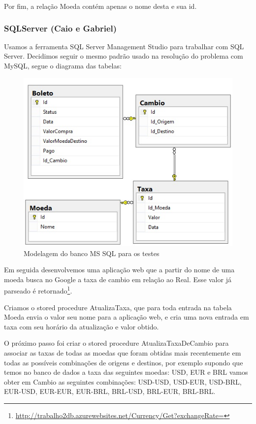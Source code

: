 \documentclass[conference]{IEEEtran}
\begin{document}
    Por fim, a relação Moeda contém apenas o nome desta e sua id.

    \subsubsection{SQLServer (Caio e Gabriel)}
  	Usamos a ferramenta SQL Server Management Studio para trabalhar com SQL Server.			
  	Decidimos seguir o mesmo padrão usado na resolução do problema com MySQL, segue o diagrama das tabelas:
   
    \begin{figure}[!t]
      \centering
  	  \includegraphics[scale=0.65]{img/tabela.jpg}
      \caption{Modelagem do banco MS SQL para os testes}
    \end{figure}

  	Em seguida desenvolvemos uma aplicação web que a partir do nome de uma moeda busca no Google a taxa de cambio em relação ao Real. Esse valor já parseado é retornado\footnote{\href{http://trabalho2db.azurewebsites.net/Currency/Get?exchangeRate=}{http://trabalho2db.azurewebsites.net/Currency/Get?exchangeRate=}}.

  	Criamos o stored procedure AtualizaTaxa, que para toda entrada na tabela Moeda envia o valor seu nome para a aplicação web, e cria uma nova entrada em taxa com seu horário da atualização e valor obtido.

  	O próximo passo foi criar o stored procedure AtualizaTaxaDeCambio para associar as taxas de todas as moedas que foram obtidas mais recentemente em todas as possíveis combinações de origens e destinos, por exemplo supondo que temos no banco de dados a taxa das seguintes moedas: USD, EUR e BRL vamos obter em Cambio as seguintes combinações: USD-USD, USD-EUR, USD-BRL, EUR-USD, EUR-EUR, EUR-BRL, BRL-USD, BRL-EUR, BRL-BRL.
\end{document}
